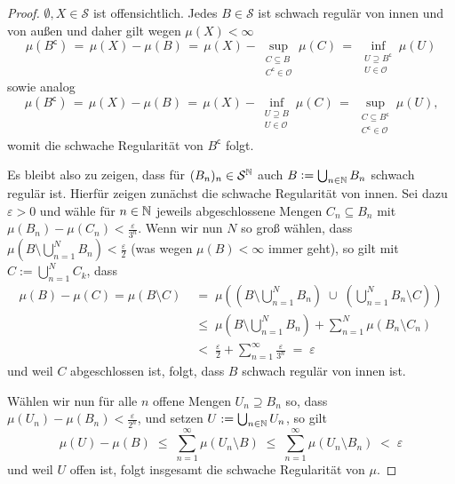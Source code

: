 \documentclass[../main/main.tex]{subfiles}
\begin{document}
	\begin{proof}
		$\emptyset, X \in \mathcal{S}$ ist offensichtlich. Jedes $B \in \mathcal{S}$ ist schwach regulär 
		von innen und von außen und daher gilt wegen $\mu(X) < \infty$
		$$\mu(B^\mathsf{c}) \, = \, \mu(X) - \mu(B) \, = \, \mu(X) - \sup_{\substack{C \subseteq B \\ C^\mathsf{c} \in \mathcal{O}}} \mu(C) \, = \, \inf_{\substack{U \supseteq B^\mathsf{c} \\ U \in \mathcal{O}}} \mu(U)$$
		sowie analog
		$$\mu(B^\mathsf{c}) \, = \, \mu(X) - \mu(B) \, = \, \mu(X) - \inf_{\substack{U \supseteq B \\ U \in \mathcal{O}}} \mu(C) \, = \, \sup_{\substack{C \subseteq B^\mathsf{c} \\ C^\mathsf{c} \in \mathcal{O}}} \mu(U) \text{,}$$
		womit die schwache Regularität von $B^\mathsf{c}$ folgt. 
		
		Es bleibt also zu zeigen, dass für $(B_n)_n \in \mathcal{S}^{\mathbb{N}}$ auch $B \vcentcolon = \bigcup_{n \in \mathbb{N}} B_n$ 
		schwach regulär ist. Hierfür zeigen zunächst die schwache Regularität von innen. 
		Sei dazu $\varepsilon > 0$ und wähle für $n \in \mathbb{N}$ jeweils abgeschlossene Mengen 
		$C_n \subseteq B_n$ mit $\mu(B_n) - \mu(C_n) < \frac{\varepsilon}{3^n}$.
		Wenn wir nun $N$ so groß wählen, dass $\mu\left( B \setminus \bigcup_{n=1}^N B_n \right) < \frac{\varepsilon}{2}$ 
		(was wegen $\mu(B) < \infty$ immer geht), so gilt mit $C := \bigcup_{n=1}^N C_k$, dass 
		\begin{align*}
			\mu(B) - \mu(C) = \mu(B\setminus C) \; &=    \; \mu\left( \left( B \setminus \bigcup_{n=1}^N B_n \right) \; \cup \; \left( \bigcup_{n=1}^N B_n  \setminus C \right) \right) \\
			&\leq \; \mu \left( B \setminus \bigcup_{n=1}^N B_n \right) + \sum_{n=1}^{N} \mu(B_n \setminus C_n) \\
			&<    \; \frac{\varepsilon}{2} + \sum_{n=1}^{\infty} \frac{\varepsilon}{3^n} \; = \; \varepsilon
		\end{align*}
		und weil $C$ abgeschlossen ist, folgt, dass $B$ schwach regulär von innen ist.
		
		Wählen wir nun für alle $n$ offene Mengen $U_n \supseteq B_n$ so, 
		dass $\mu(U_n) - \mu(B_n) < \frac{\varepsilon}{2^n}$, und setzen $U := \bigcup_{n \in \mathbb{N}} U_n$, so gilt
		$$\mu(U) - \mu(B) \; \leq \; \sum_{n=1}^\infty \mu(U_n \setminus B) \; \leq \; \sum_{n=1}^\infty \mu(U_n \setminus B_n) \; < \; \varepsilon$$
		und weil $U$ offen ist, folgt insgesamt die schwache Regularität von $\mu$.
	\end{proof}
	
\end{document}
